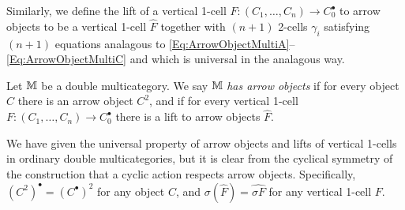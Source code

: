 Similarly, we define the lift of a vertical 1-cell $F\colon(C_1,\dots,C_n)\to C_0^{\bullet}$ to arrow objects to be a vertical 1-cell $\hat{F}$ together with $(n+1)$ 2-cells $\gamma_i$ satisfying $(n+1)$ equations analagous to \eqref{Eq:ArrowObjectMultiA}--\eqref{Eq:ArrowObjectMultiC} and which is universal in the analagous way.

\begin{definition}
	Let $\mathbb{M}$ be a double multicategory. We say $\mathbb{M}$ \emph{has arrow objects} if for every object $C$ there is an arrow object $C^2$, and if for every vertical 1-cell $F\colon(C_1,\dots,C_n)\to C_0^{\bullet}$ there is a lift to arrow objects $\hat{F}$.
\end{definition}

We have given the universal property of arrow objects and lifts of vertical 1-cells in ordinary double multicategories, but it is clear from the cyclical symmetry of the construction that a cyclic action respects arrow objects. Specifically, $(C^2)^{\bullet}=(C^{\bullet})^2$ for any object $C$, and $\sigma(\hat{F})=\widehat{\sigma F}$ for any vertical 1-cell $F$.
